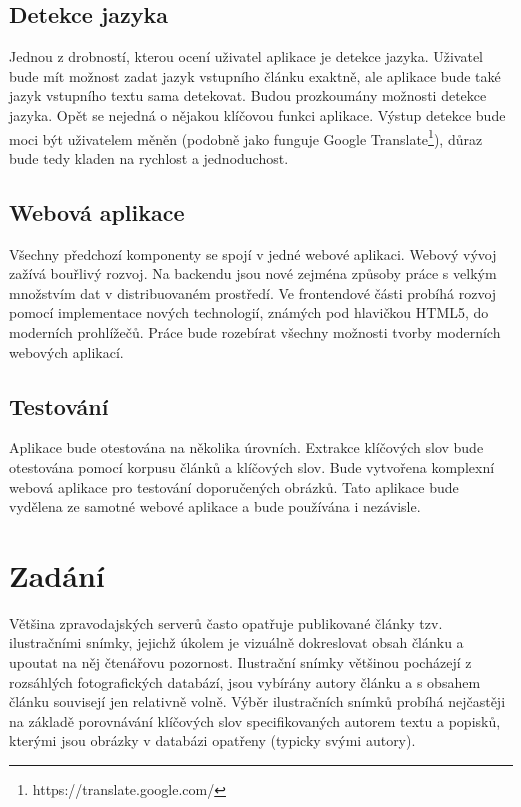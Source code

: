 \section{Detekce jazyka}

Jednou z drobností, kterou ocení uživatel aplikace je detekce jazyka. Uživatel bude mít možnost zadat jazyk vstupního článku exaktně, ale aplikace bude také jazyk vstupního textu sama detekovat. Budou prozkoumány možnosti detekce jazyka. Opět se nejedná o nějakou klíčovou funkci aplikace. Výstup detekce bude moci být uživatelem měněn (podobně jako funguje Google Translate\footnote{https://translate.google.com/}), důraz bude tedy kladen na rychlost a jednoduchost.

\section{Webová aplikace}

Všechny předchozí komponenty se spojí v jedné webové aplikaci. Webový vývoj zažívá bouřlivý rozvoj. Na backendu jsou nové zejména způsoby práce s velkým množstvím dat v distribuovaném prostředí. Ve frontendové části probíhá rozvoj pomocí implementace nových technologií, známých pod hlavičkou HTML5, do moderních prohlížečů. Práce bude rozebírat všechny možnosti tvorby moderních webových aplikací.

\section{Testování}

Aplikace bude otestována na několika úrovních. Extrakce klíčových slov bude otestována pomocí korpusu článků a klíčových slov. Bude vytvořena komplexní webová aplikace pro testování doporučených obrázků. Tato aplikace bude vydělena ze samotné webové aplikace a bude používána i nezávisle.

\chapter{Zadání}

Většina zpravodajských serverů často opatřuje publikované články tzv. ilustračními snímky, jejichž úkolem je vizuálně dokreslovat obsah článku a upoutat na něj čtenářovu pozornost. Ilustrační snímky většinou pocházejí z rozsáhlých fotografických databází, jsou vybírány autory článku a s obsahem článku souvisejí jen relativně volně. Výběr ilustračních snímků probíhá nejčastěji na základě porovnávání klíčových slov specifikovaných autorem textu a popisků, kterými jsou obrázky v databázi opatřeny (typicky svými autory). 

